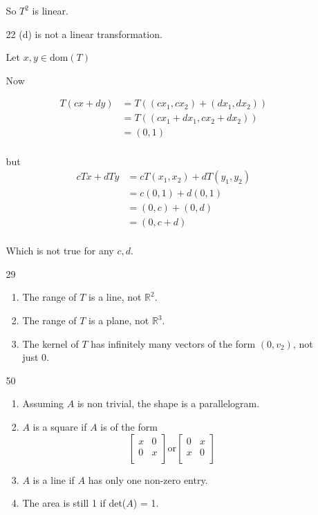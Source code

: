 \documentclass[12pt,letterpaper]{article}
\begin{document}
\begin{enumerate}[label=\S 2.\arabic*]
\begin{enumerate}
          So $T^2$ is linear.
        \item [22]
          (d) is not a linear transformation.

          Let $x, y \in \text{dom}(T)$

          Now

          \begin{align*}
            T(cx + dy)
            &= T\left((cx_1, cx_2) + (dx_1, dx_2)\right) \\
            &= T\left((cx_1 + dx_1, cx_2 + dx_2)\right) \\
            &= (0, 1) \\
          \end{align*}

          but
          \begin{align*}
            cTx + dTy
            &= cT(x_1, x_2) + dT(y_1, y_2) \\
            &= c(0, 1) + d(0, 1) \\
            &= (0, c) + (0, d) \\
            &= (0, c + d) \\
          \end{align*}

          Which is not true for any $c, d$.
        \item [29]
          \begin{enumerate}
            \item The range of $T$ is a line, not $\mathbb{R}^2$.
            \item The range of $T$ is a plane, not $\mathbb{R}^3$.
            \item The kernel of $T$ has infinitely many vectors of the form $(0, v_2)$, not just 0.
          \end{enumerate}
        \item [50]
          \begin{enumerate}
            \item
              Assuming $A$ is non trivial, the shape is a parallelogram.
            \item
              $A$ is a square if $A$ is of the form
              \[
                \begin{bmatrix}
                  x & 0 \\
                  0 & x \\
                \end{bmatrix}
                \text{or}
                \begin{bmatrix}
                  0 & x \\
                  x & 0 \\
                \end{bmatrix}
              \]
            \item
              $A$ is a line if $A$ has only one non-zero entry.
            \item
              The area is still 1 if det($A$) = 1.
          \end{enumerate}
      \end{enumerate}
  \end{enumerate}
\end{document}
